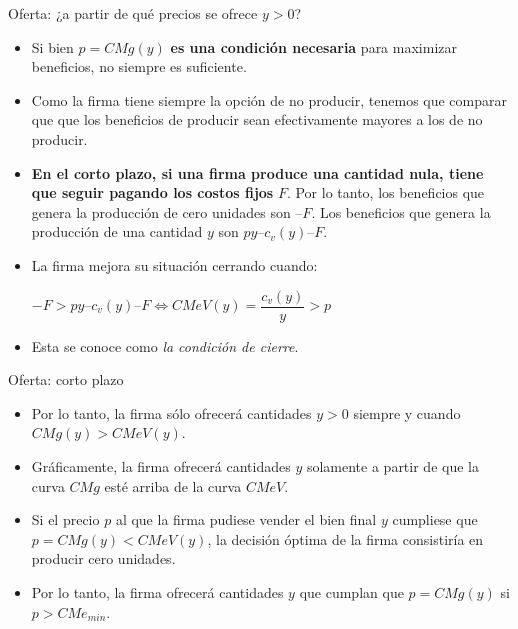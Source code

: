 \documentclass{beamer}
\theoremstyle{definition}
\begin{document}
\begin{frame}{Oferta: ¿a partir de qué precios se ofrece $y>0$?}
\begin{itemize}
\item Si bien $p=CMg(y)$ \textbf{es una condición necesaria} para maximizar beneficios, no siempre es suficiente. %
\item Como la firma tiene siempre la opción de no producir, tenemos que comparar que que los beneficios de producir sean efectivamente mayores a los de no producir.
\item \textbf{En el corto plazo, si una firma produce una cantidad nula, tiene que seguir pagando los costos fijos}
$F$. Por lo tanto, los beneficios que genera la producción de cero unidades son $– F$. Los beneficios que genera la producción de una cantidad $y$ son $py – c_v(y) – F$. 
\item La firma mejora su situación cerrando cuando:
\begin{center}
$-F>py – c_v(y) – F \Leftrightarrow CMeV(y)=\dfrac{c_v(y)}{y}>p$
\end{center}
\item Esta se conoce como \textit{la condici\'on de cierre}.
\end{itemize}
\end{frame}
\begin{frame}{Oferta: corto plazo}
\begin{itemize}
\item Por lo tanto, la firma sólo ofrecerá cantidades $y>0$ siempre y cuando $CMg(y)>CMeV(y)$. 

\item Gráficamente, la firma ofrecerá cantidades $y$ solamente a partir de que la curva $CMg$ esté arriba de la curva $CMeV$. 

\item Si el precio $p$ al que la firma pudiese vender el bien final $y$ cumpliese que $p=CMg(y)<CMeV(y)$, la decisión óptima de la firma consistiría en producir cero unidades.

\item Por lo tanto, la firma ofrecerá cantidades $y$ que cumplan que $p=CMg(y)$ si $p>CMe_{min}$.
\end{itemize}
\end{frame}
\end{document}
